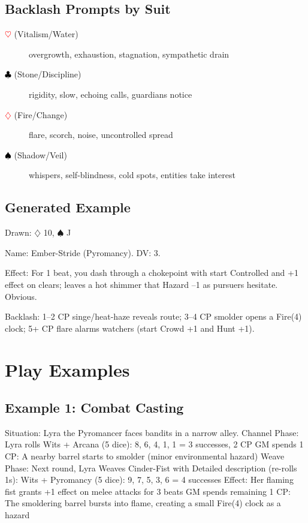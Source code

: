 \subsection{Backlash Prompts by Suit}
\begin{description}
\item[\textcolor{red}{$\heartsuit$} (Vitalism/Water)] overgrowth, exhaustion, stagnation, sympathetic drain
\item[\textcolor{black}{$\clubsuit$} (Stone/Discipline)] rigidity, slow, echoing calls, guardians notice
\item[\textcolor{red}{$\diamondsuit$} (Fire/Change)] flare, scorch, noise, uncontrolled spread
\item[\textcolor{black}{$\spadesuit$} (Shadow/Veil)] whispers, self-blindness, cold spots, entities take interest
\end{description}

\subsection{Generated Example}
Drawn: $\diamondsuit$ 10, $\spadesuit$ J

Name: Ember-Stride (Pyromancy). DV: 3.

Effect: For 1 beat, you dash through a chokepoint with start Controlled and +1 effect on clears; leaves a hot shimmer that Hazard --1 as pursuers hesitate. Obvious.

Backlash: 1--2 CP singe/heat-haze reveals route; 3--4 CP smolder opens a Fire(4) clock; 5+ CP flare alarms watchers (start Crowd +1 and Hunt +1).

\section{Play Examples}

\subsection{Example 1: Combat Casting}
Situation: Lyra the Pyromancer faces bandits in a narrow alley.
Channel Phase: Lyra rolls Wits + Arcana (5 dice): 8, 6, 4, 1, 1 = 3 successes, 2 CP
GM spends 1 CP: A nearby barrel starts to smolder (minor environmental hazard)
Weave Phase: Next round, Lyra Weaves Cinder-Fist with Detailed description (re-rolls 1s):
Wits + Pyromancy (5 dice): 9, 7, 5, 3, 6 = 4 successes
Effect: Her flaming fist grants +1 effect on melee attacks for 3 beats
GM spends remaining 1 CP: The smoldering barrel bursts into flame, creating a small Fire(4) clock as a hazard


